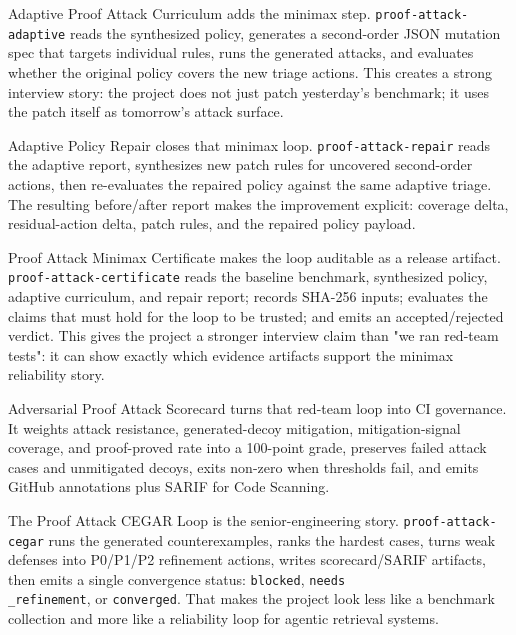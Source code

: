 \documentclass[UTF8,12pt,openany]{ctexbook}
\begin{document}
Adaptive Proof Attack Curriculum adds the minimax step. \texttt{proof-attack-adaptive} reads the synthesized policy, generates a second-order JSON mutation spec that targets individual rules, runs the generated attacks, and evaluates whether the original policy covers the new triage actions. This creates a strong interview story: the project does not just patch yesterday's benchmark; it uses the patch itself as tomorrow's attack surface.\par

Adaptive Policy Repair closes that minimax loop. \texttt{proof-attack-repair} reads the adaptive report, synthesizes new patch rules for uncovered second-order actions, then re-evaluates the repaired policy against the same adaptive triage. The resulting before/after report makes the improvement explicit: coverage delta, residual-action delta, patch rules, and the repaired policy payload.\par

Proof Attack Minimax Certificate makes the loop auditable as a release artifact. \texttt{proof-attack-certificate} reads the baseline benchmark, synthesized policy, adaptive curriculum, and repair report; records SHA-256 inputs; evaluates the claims that must hold for the loop to be trusted; and emits an accepted/rejected verdict. This gives the project a stronger interview claim than "we ran red-team tests": it can show exactly which evidence artifacts support the minimax reliability story.\par

Adversarial Proof Attack Scorecard turns that red-team loop into CI governance. It weights attack resistance, generated-decoy mitigation, mitigation-signal coverage, and proof-proved rate into a 100-point grade, preserves failed attack cases and unmitigated decoys, exits non-zero when thresholds fail, and emits GitHub annotations plus SARIF for Code Scanning.\par

The Proof Attack CEGAR Loop is the senior-engineering story. \texttt{proof-attack-cegar} runs the generated counterexamples, ranks the hardest cases, turns weak defenses into P0/P1/P2 refinement actions, writes scorecard/SARIF artifacts, then emits a single convergence status: \texttt{blocked}, \texttt{needs\\_refinement}, or \texttt{converged}. That makes the project look less like a benchmark collection and more like a reliability loop for agentic retrieval systems.\par
\end{document}
